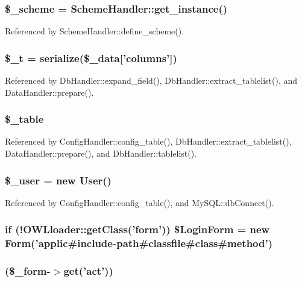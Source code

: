 \subsubsection[{\$\_\-scheme}]{\setlength{\rightskip}{0pt plus 5cm}\$\_\-scheme = SchemeHandler::get\_\-instance()}\label{index_8php_abb5321c25f21f089f5c253d5f2697502}


Referenced by SchemeHandler::define\_\-scheme().

\subsubsection[{\$\_\-t}]{\setlength{\rightskip}{0pt plus 5cm}\$\_\-t = serialize(\$\_\-data\mbox{[}'columns'\mbox{]})}\label{index_8php_a7a22c26026cc0626b015085e752b45cb}


Referenced by DbHandler::expand\_\-field(), DbHandler::extract\_\-tablelist(), and DataHandler::prepare().

\subsubsection[{\$\_\-table}]{\setlength{\rightskip}{0pt plus 5cm}\$\_\-table}\label{index_8php_ac0ee5b766d19cb282552a3449a1f8376}


Referenced by ConfigHandler::config\_\-table(), DbHandler::extract\_\-tablelist(), DataHandler::prepare(), and DbHandler::tablelist().

\subsubsection[{\$\_\-user}]{\setlength{\rightskip}{0pt plus 5cm}\$\_\-user = new {\bf User}()}\label{index_8php_a5df5982b9dadc74df05081972cd67fdf}


Referenced by ConfigHandler::config\_\-table(), and MySQL::dbConnect().

\subsubsection[{\$LoginForm}]{\setlength{\rightskip}{0pt plus 5cm}if (!OWLloader::getClass('form')) \$LoginForm = new {\bf Form}('applic\#include-\/path\#classfile\#class\#method')}\label{index_8php_ae89d28a5f6ccd73a8cb4a0253db78766}
\subsubsection[{switch}]{(\$\_\-form-\/$>$get('act'))}\label{index_8php_aa284f7d5270c1aa684d885f7bb70d532}
